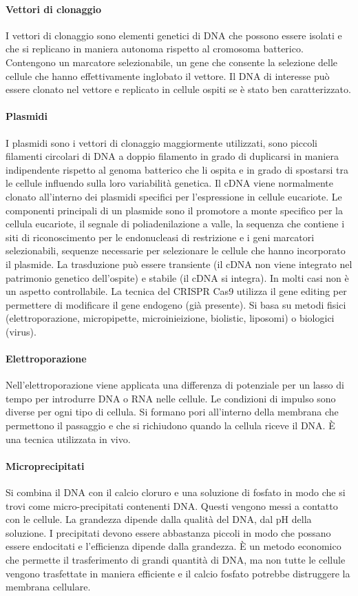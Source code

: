 \paragraph{Vettori di clonaggio}
I vettori di clonaggio sono elementi genetici di DNA che possono essere isolati e che si replicano in maniera autonoma rispetto al cromosoma batterico. Contengono un marcatore 
selezionabile, un gene che consente la selezione delle cellule che hanno effettivamente inglobato il vettore. Il DNA di interesse pu\`o essere clonato nel vettore e replicato in cellule
ospiti se \`e stato ben caratterizzato. 
\paragraph{Plasmidi}
I plasmidi sono i vettori di clonaggio maggiormente utilizzati, sono piccoli filamenti circolari di DNA a doppio filamento in grado di duplicarsi in maniera indipendente rispetto al 
genoma batterico che li ospita e in grado di spostarsi tra le cellule influendo sulla loro variabilit\`a genetica. Il cDNA viene normalmente clonato all'interno dei plasmidi specifici 
per l'espressione in cellule eucariote. Le componenti principali di un plasmide sono il promotore a monte specifico per la cellula eucariote, il segnale di poliadenilazione a valle, la
sequenza che contiene i siti di riconoscimento per le endonucleasi di restrizione e i geni marcatori selezionabili, sequenze necessarie per selezionare le cellule che hanno incorporato 
il plasmide. La trasduzione pu\`o essere transiente (il cDNA non viene integrato nel patrimonio genetico dell'ospite) e stabile (il cDNA si integra). In molti casi non \`e un aspetto
controllabile. La tecnica del CRISPR Cas9 utilizza il gene editing per permettere di modificare il gene endogeno (gi\`a presente). Si basa su metodi fisici (elettroporazione,
micropipette, microinieizione, biolistic, liposomi) o biologici (virus). 
\paragraph{Elettroporazione}
Nell'elettroporazione viene applicata una differenza di potenziale per un lasso di tempo per introdurre DNA o RNA nelle cellule. Le condizioni di impulso sono diverse per ogni tipo di 
cellula. Si formano pori all'interno della membrana che permettono il passaggio e che si richiudono quando la cellula riceve il DNA. \`E una tecnica utilizzata in vivo.
\paragraph{Microprecipitati}
Si combina il DNA con il calcio cloruro e una soluzione di fosfato in modo che si trovi come micro-precipitati contenenti DNA. Questi vengono messi a contatto con le cellule. La 
grandezza dipende dalla qualit\`a del DNA, dal pH della soluzione. I precipitati devono essere abbastanza piccoli in modo che possano essere endocitati e l'efficienza dipende dalla 
grandezza. \`E un metodo economico che permette il trasferimento di grandi quantit\`a di DNA, ma non tutte le cellule vengono trasfettate in maniera efficiente e il calcio fosfato 
potrebbe distruggere la membrana cellulare. 

